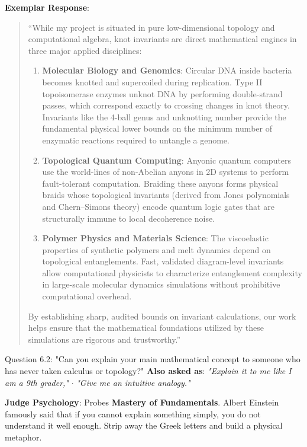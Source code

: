 \documentclass[11pt,letterpaper]{article}
\begin{document}
\begin{exemplarbox}
\textbf{Exemplar Response}:
\begin{quote}
``While my project is situated in pure low-dimensional topology and computational algebra, knot invariants are direct mathematical engines in three major applied disciplines:
\begin{enumerate}
    \item \textbf{Molecular Biology and Genomics}: Circular DNA inside bacteria becomes knotted and supercoiled during replication. Type II topoisomerase enzymes unknot DNA by performing double-strand passes, which correspond exactly to crossing changes in knot theory. Invariants like the 4-ball genus and unknotting number provide the fundamental physical lower bounds on the minimum number of enzymatic reactions required to untangle a genome.
    \item \textbf{Topological Quantum Computing}: Anyonic quantum computers use the world-lines of non-Abelian anyons in 2D systems to perform fault-tolerant computation. Braiding these anyons forms physical braids whose topological invariants (derived from Jones polynomials and Chern--Simons theory) encode quantum logic gates that are structurally immune to local decoherence noise.
    \item \textbf{Polymer Physics and Materials Science}: The viscoelastic properties of synthetic polymers and melt dynamics depend on topological entanglements. Fast, validated diagram-level invariants allow computational physicists to characterize entanglement complexity in large-scale molecular dynamics simulations without prohibitive computational overhead.
\end{enumerate}
By establishing sharp, audited bounds on invariant calculations, our work helps ensure that the mathematical foundations utilized by these simulations are rigorous and trustworthy.''
\end{quote}
\end{exemplarbox}

\vspace{1em}

\begin{questionbox}{Question 6.2: "Can you explain your main mathematical concept to someone who has never taken calculus or topology?"}
\textbf{Also asked as}: \textit{"Explain it to me like I am a 9th grader,"} $\cdot$ \textit{"Give me an intuitive analogy."}
\end{questionbox}

\begin{strategybox}
\textbf{Judge Psychology}: Probes \textbf{Mastery of Fundamentals}. Albert Einstein famously said that if you cannot explain something simply, you do not understand it well enough. Strip away the Greek letters and build a physical metaphor.
\end{strategybox}
\end{document}
